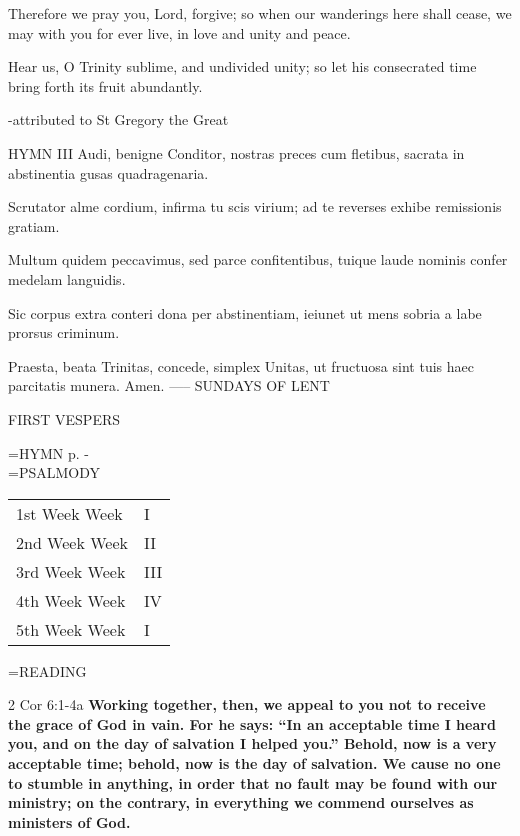 Therefore we pray you, Lord, forgive;
so when our wanderings here shall cease,
we may with you for ever live,
in love and unity and peace.

Hear us, O Trinity sublime,
and undivided unity;
so let his consecrated time
bring forth its fruit abundantly.

-attributed to St Gregory the Great

HYMN III
Audi, benigne Conditor,
nostras preces cum fletibus,
sacrata in abstinentia
gusas quadragenaria.

Scrutator alme cordium,
infirma tu scis virium;
ad te reverses exhibe
remissionis gratiam.

Multum quidem peccavimus,
sed parce confitentibus,
tuique laude nominis
confer medelam languidis.

Sic corpus extra conteri
dona per abstinentiam,
ieiunet ut mens sobria
a labe prorsus criminum.

Praesta, beata Trinitas,
concede, simplex Unitas,
ut fructuosa sint tuis
haec parcitatis munera. Amen.
-----
SUNDAYS OF LENT
\begin{flushleft}\normalsize FIRST VESPERS\\\end{flushleft}
\hangindent=\parindent \small{\uppercase{HYMN} p. \pageref{lent:firstHymn}-\pageref{lent:lastHymn}\\}
\hangindent=\parindent \small{PSALMODY}
\begin{center}
\begin{tabular}{ l l }
1st Week	Week &  I\\
2nd Week	Week &  II\\
3rd Week	Week &  III\\
4th Week	Week &  IV\\
5th Week	Week &  I\\
\end{tabular}
\end{center}		

\hangindent=\parindent \small READING
\begin{description}[labelindent=\parindent, leftmargin=*]
\item [Weeks 1-4:]     2 Cor 6:1-4a \textbf{    Working together, then, we appeal to you not to receive the grace of God in vain. For he says: “In an acceptable time I heard you, and on the day of salvation I helped you.” Behold, now is a very acceptable time; behold, now is the day of salvation. We cause no one to stumble in anything, in order that no fault may be found with our ministry; on the contrary, in everything we commend ourselves as ministers of God.\\}
\end{description}

